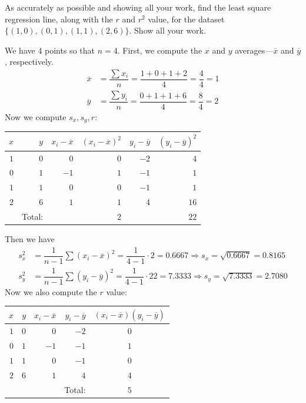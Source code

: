 \documentclass[11pt,letterpaper]{article}
\begin{document}

 As accurately as possible and showing all your work, find the least square regression line, along with the $r$ and $r^2$ value, for the dataset $\{ (1, 0), (0, 1), (1, 1), (2, 6) \}$. Show all your work. \pspace

\sol We have 4 points so that $n= 4$. First, we compute the $x$ and $y$ averages---$\overline{x}$ and $\overline{y}$, respectively. 
	\[
	\begin{aligned}
	\overline{x}&= \dfrac{\sum x_i}{n}= \dfrac{1 + 0 + 1 + 2}{4}= \dfrac{4}{4}= 1 \\
	\overline{y}&= \dfrac{\sum y_i}{n}= \dfrac{0 + 1 + 1 + 6}{4}= \dfrac{8}{4}= 2 
	\end{aligned}
	\]
Now we compute $s_x, s_y, r$:
	\begin{table}[!ht]
	\centering
	\begin{tabular}{rrrrrr}
	$x$ & $y$ & $x_i - \overline{x}$ & $(x_i - \overline{x})^2$ & $y_i - \overline{y}$ & $(y_i - \overline{y})^2$ \\ \hline
	$1$ & $0$ & $0$ & $0$ & $-2$ & $4$ \\ 
	$0$ & $1$ & $-1$ & $1$ & $-1$ & $1$ \\
	$1$ & $1$ & $0$ & $0$ & $-1$ & $1$ \\
	$2$ & $6$ & $1$ & $1$ & $4$ & $16$ \\ \hline
	& Total: & & $2$ & & $22$ 
	\end{tabular}
	\end{table}
Then we have
	\[
	\begin{aligned}
	s_x^2&= \dfrac{1}{n - 1} \sum (x_i - \overline{x})^2= \dfrac{1}{4 - 1} \cdot 2= 0.6667 \Longrightarrow s_x= \sqrt{0.6667}= 0.8165 \\
	s_y^2&= \dfrac{1}{n - 1} \sum (y_i - \overline{y})^2= \dfrac{1}{4 - 1} \cdot 22= 7.3333 \Longrightarrow s_y= \sqrt{7.3333}= 2.7080
	\end{aligned}
	\]
Now we also compute the $r$ value:
	\begin{table}[!ht]
	\centering
	\begin{tabular}{rrrrc}
	$x$ & $y$ & $x_i - \overline{x}$ & $y_i - \overline{y}$ & $(x_i - \overline{x})(y_i - \overline{y})$ \\ \hline
	$1$ & $0$ & $0$ & $-2$ & $0$ \\
	$0$ & $1$ & $-1$ & $-1$ & $1$ \\
	$1$ & $1$ & $0$ & $-1$ & $0$ \\
	$2$ & $6$ & $1$ & $4$ & $4$ \\ \hline
		& 	& 	& Total: & $5$
	\end{tabular}
	\end{table}
\end{document}
